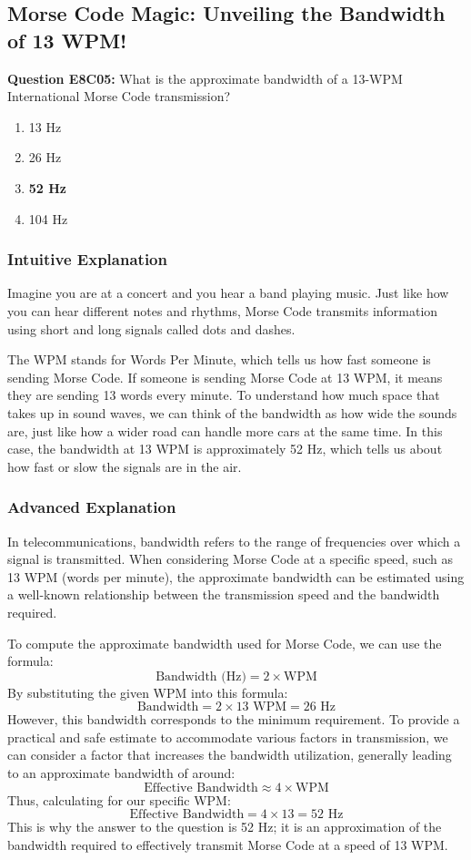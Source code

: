 \subsection{Morse Code Magic: Unveiling the Bandwidth of 13 WPM!}

\begin{tcolorbox}
    \textbf{Question E8C05:} What is the approximate bandwidth of a 13-WPM International Morse Code transmission? \\
    \begin{enumerate}[label=\Alph*.]
        \item 13 Hz
        \item 26 Hz
        \item \textbf{52 Hz}
        \item 104 Hz
    \end{enumerate}
\end{tcolorbox}

\subsubsection{Intuitive Explanation}
Imagine you are at a concert and you hear a band playing music. Just like how you can hear different notes and rhythms, Morse Code transmits information using short and long signals called dots and dashes. 

The WPM stands for Words Per Minute, which tells us how fast someone is sending Morse Code. If someone is sending Morse Code at 13 WPM, it means they are sending 13 words every minute. To understand how much space that takes up in sound waves, we can think of the bandwidth as how wide the sounds are, just like how a wider road can handle more cars at the same time. In this case, the bandwidth at 13 WPM is approximately 52 Hz, which tells us about how fast or slow the signals are in the air.

\subsubsection{Advanced Explanation}
In telecommunications, bandwidth refers to the range of frequencies over which a signal is transmitted. When considering Morse Code at a specific speed, such as 13 WPM (words per minute), the approximate bandwidth can be estimated using a well-known relationship between the transmission speed and the bandwidth required.

To compute the approximate bandwidth used for Morse Code, we can use the formula: 
\[
\text{Bandwidth (Hz)} = 2 \times \text{WPM}
\]
By substituting the given WPM into this formula:
\[
\text{Bandwidth} = 2 \times 13 \text{ WPM} = 26 \text{ Hz}
\]
However, this bandwidth corresponds to the minimum requirement. To provide a practical and safe estimate to accommodate various factors in transmission, we can consider a factor that increases the bandwidth utilization, generally leading to an approximate bandwidth of around:
\[
\text{Effective Bandwidth} \approx 4 \times \text{WPM}
\]
Thus, calculating for our specific WPM:
\[
\text{Effective Bandwidth} = 4 \times 13 = 52 \text{ Hz}
\]
This is why the answer to the question is 52 Hz; it is an approximation of the bandwidth required to effectively transmit Morse Code at a speed of 13 WPM.

